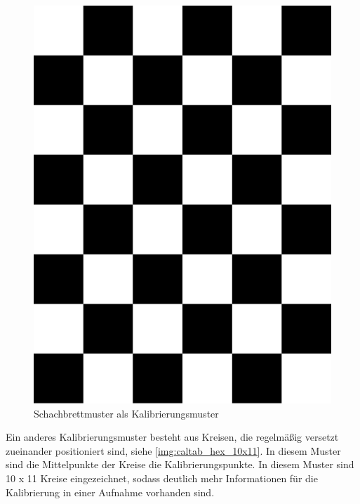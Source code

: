 \begin{figure}[!hbt]
	\centering
	\vspace{1ex}
	\includegraphics[scale=0.3, angle=90]{../images/chess5x7x3}
	\caption[Schachbrettmuster als Kalibrierungsmuster]{\label{img:chess5x7x0.03} Schachbrettmuster als Kalibrierungsmuster}
	\vspace{1ex}
\end{figure}

Ein anderes Kalibrierungsmuster besteht aus Kreisen, die regelmäßig versetzt zueinander positioniert sind, siehe \autoref{img:caltab_hex_10x11}. In diesem Muster sind die Mittelpunkte der Kreise die Kalibrierungspunkte. In diesem Muster sind 10 x 11 Kreise eingezeichnet, sodass deutlich mehr Informationen für die Kalibrierung in einer Aufnahme vorhanden sind. 

